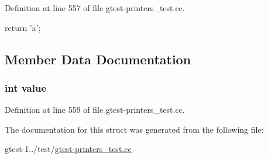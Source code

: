 \-Definition at line 557 of file gtest-\/printers\-\_\-test.\-cc.


\begin{DoxyCode}
{ return 'a'; }
\end{DoxyCode}


\subsection{\-Member \-Data \-Documentation}
\hypertarget{structtesting_1_1gtest__printers__test_1_1Foo_ac4f474c82e82cbb89ca7c36dd52be0ed}{
\subsubsection[{value}]{\setlength{\rightskip}{0pt plus 5cm}int {\bf value}}}\label{d3/dfb/structtesting_1_1gtest__printers__test_1_1Foo_ac4f474c82e82cbb89ca7c36dd52be0ed}


\-Definition at line 559 of file gtest-\/printers\-\_\-test.\-cc.



\-The documentation for this struct was generated from the following file\-:\begin{DoxyCompactItemize}
\item 
gtest-\/1../test/\hyperlink{gtest-printers__test_8cc}{gtest-\/printers\-\_\-test.\-cc}\end{DoxyCompactItemize}
